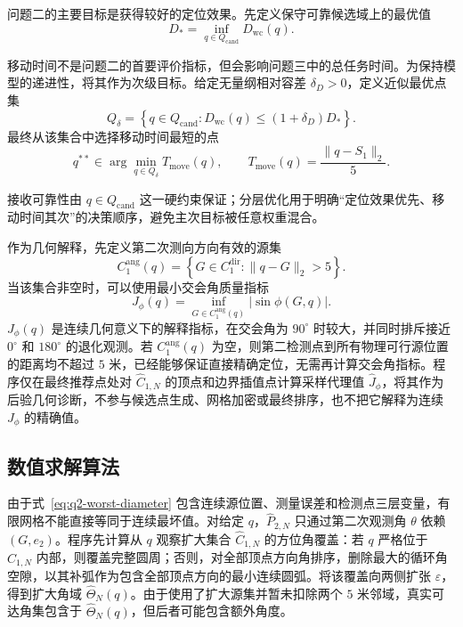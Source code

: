 问题二的主要目标是获得较好的定位效果。先定义保守可靠候选域上的最优值
\begin{equation}
  D_*=\inf_{q\in Q_{\mathrm{cand}}}D_{\mathrm{wc}}(q).
  \label{eq:q2-primary-objective}
\end{equation}

移动时间不是问题二的首要评价指标，但会影响问题三中的总任务时间。为保持模型的递进性，将其作为次级目标。给定无量纲相对容差 $\delta_D>0$，定义近似最优点集
\begin{equation}
  Q_\delta=
  \left\{
  q\in Q_{\mathrm{cand}}:
  D_{\mathrm{wc}}(q)\leq(1+\delta_D)D_*
  \right\}.
  \label{eq:q2-near-optimal-set}
\end{equation}
最终从该集合中选择移动时间最短的点
\begin{equation}
  q^{**}\in\arg\min_{q\in Q_\delta}
  T_{\mathrm{move}}(q),
  \qquad
  T_{\mathrm{move}}(q)=\frac{\|q-S_1\|_2}{5}.
  \label{eq:q2-secondary-objective}
\end{equation}

接收可靠性由 $q\in Q_{\mathrm{cand}}$ 这一硬约束保证；分层优化用于明确“定位效果优先、移动时间其次”的决策顺序，避免主次目标被任意权重混合。

作为几何解释，先定义第二次测向方向有效的源集
\[
  C_1^{\mathrm{ang}}(q)
  =\left\{G\in C_1^{\mathrm{dir}}:\|q-G\|_2>5\right\}.
\]
当该集合非空时，可以使用最小交会角质量指标
\begin{equation}
  J_\phi(q)=\inf_{G\in C_1^{\mathrm{ang}}(q)}|\sin\phi(G,q)|.
  \label{eq:q2-angle-quality}
\end{equation}
$J_\phi(q)$ 是连续几何意义下的解释指标，在交会角为 $90^\circ$ 时较大，并同时排斥接近 $0^\circ$ 和 $180^\circ$ 的退化观测。若 $C_1^{\mathrm{ang}}(q)$ 为空，则第二检测点到所有物理可行源位置的距离均不超过 $5$ 米，已经能够保证直接精确定位，无需再计算交会角指标。程序仅在最终推荐点处对 $\widehat C_{1,N}$ 的顶点和边界插值点计算采样代理值 $\widehat J_\phi$，将其作为后验几何诊断，不参与候选点生成、网格加密或最终排序，也不把它解释为连续 $J_\phi$ 的精确值。

\subsection{数值求解算法}

由于式~\eqref{eq:q2-worst-diameter} 包含连续源位置、测量误差和检测点三层变量，有限网格不能直接等同于连续最坏值。对给定 $q$，$\widehat P_{2,N}$ 只通过第二次观测角 $\theta$ 依赖 $(G,e_2)$。程序先计算从 $q$ 观察扩大集合 $\widehat C_{1,N}$ 的方位角覆盖：若 $q$ 严格位于 $\widehat C_{1,N}$ 内部，则覆盖完整圆周；否则，对全部顶点方向角排序，删除最大的循环角空隙，以其补弧作为包含全部顶点方向的最小连续圆弧。将该覆盖向两侧扩张 $\varepsilon$，得到扩大角域 $\widehat\Theta_N(q)$。由于使用了扩大源集并暂未扣除两个 $5$ 米邻域，真实可达角集包含于 $\widehat\Theta_N(q)$，但后者可能包含额外角度。

